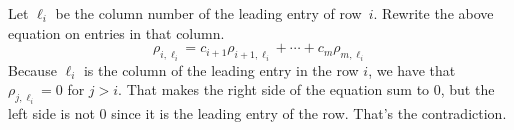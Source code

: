 \begin{exercises}
\begin{answer}
\begin{exparts}
          Let $\ell_{i}$ be the column number of the leading entry of
          row~$i$. 
          Rewrite the above equation on entries in that column.
          \begin{equation*}
             \rho_{i,\ell_{i}}=c_{i+1}\rho_{i+1,\ell_{i}}
                             +\cdots+c_m\rho_{m,\ell_{i}}
          \end{equation*}
          Because $\ell_{i}$ is the column of the leading entry in the
          row $i$, we have that $\rho_{j,\ell_{i}}=0$ for $j>i$.
          That makes the right side of the equation sum to $0$, but the
          left side is not $0$ since it is the leading entry of the row. 
          That's the contradiction. 
      \end{exparts}  
    \end{answer}



\end{exercises}

